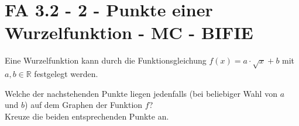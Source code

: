 \section{FA 3.2 - 2 - Punkte einer Wurzelfunktion  - MC - BIFIE}


\begin{beispiel}[FA 3.2]{1} %
Eine Wurzelfunktion kann durch die Funktionsgleichung $f(x)=a\cdot \sqrt{x}+b$ mit $a,b \in \mathbb{R}$ festgelegt werden.
\leer

Welche der nachstehenden Punkte liegen jedenfalls (bei beliebiger Wahl von $a$ und $b$) auf dem Graphen der Funktion $f$? \\
Kreuze die beiden entsprechenden Punkte an.

\end{beispiel}